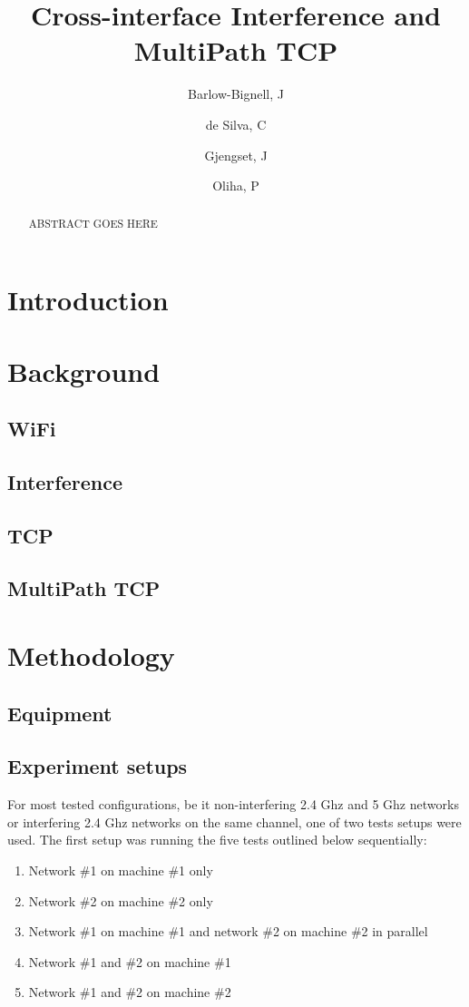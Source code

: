 \documentclass[12pt,a4paper]{article}
\title{Cross-interface Interference and MultiPath TCP}
\author{Barlow-Bignell, J}
\author{de Silva, C}
\author{Gjengset, J}
\author{Oliha, P}
\affil{University College London}
\date{}
\begin{document}
\maketitle

\begin{abstract}
  ABSTRACT GOES HERE
\end{abstract}
\clearpage

\section{Introduction}

\section{Background}
\subsection{WiFi}
\subsection{Interference}
\subsection{TCP}
\subsection{MultiPath TCP}

\section{Methodology}
\subsection{Equipment}
\subsection{Experiment setups}
For most tested configurations, be it non-interfering 2.4 Ghz and 5 Ghz networks
or interfering 2.4 Ghz networks on the same channel, one of two tests setups
were used. The first setup was running the five tests outlined below
sequentially:

\begin{enumerate}
  \item Network \#1 on machine \#1 only
  \item Network \#2 on machine \#2 only
  \item Network \#1 on machine \#1 and network \#2 on machine \#2 in parallel
  \item Network \#1 and \#2 on machine \#1
  \item Network \#1 and \#2 on machine \#2
\end{enumerate}
\end{document}
